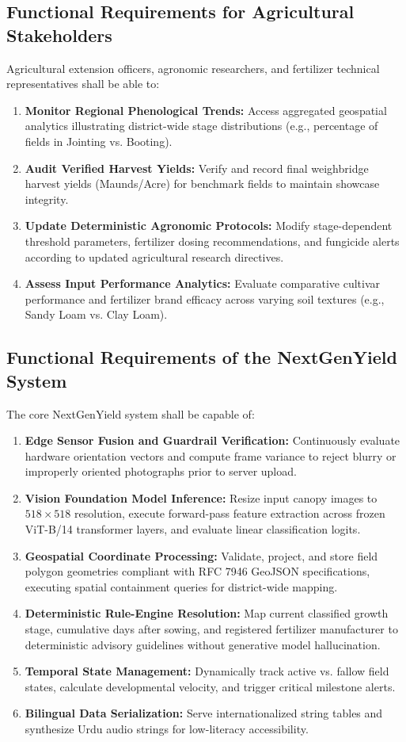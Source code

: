 \subsection{Functional Requirements for Agricultural Stakeholders}
Agricultural extension officers, agronomic researchers, and fertilizer technical representatives shall be able to:
\begin{enumerate}
    \item \textbf{Monitor Regional Phenological Trends:} Access aggregated geospatial analytics illustrating district-wide stage distributions (e.g., percentage of fields in Jointing vs. Booting).
    \item \textbf{Audit Verified Harvest Yields:} Verify and record final weighbridge harvest yields (Maunds/Acre) for benchmark fields to maintain showcase integrity.
    \item \textbf{Update Deterministic Agronomic Protocols:} Modify stage-dependent threshold parameters, fertilizer dosing recommendations, and fungicide alerts according to updated agricultural research directives.
    \item \textbf{Assess Input Performance Analytics:} Evaluate comparative cultivar performance and fertilizer brand efficacy across varying soil textures (e.g., Sandy Loam vs. Clay Loam).
\end{enumerate}

\subsection{Functional Requirements of the NextGenYield System}
The core NextGenYield system shall be capable of:
\begin{enumerate}
    \item \textbf{Edge Sensor Fusion and Guardrail Verification:} Continuously evaluate hardware orientation vectors and compute frame variance to reject blurry or improperly oriented photographs prior to server upload.
    \item \textbf{Vision Foundation Model Inference:} Resize input canopy images to $518 \times 518$ resolution, execute forward-pass feature extraction across frozen ViT-B/14 transformer layers, and evaluate linear classification logits.
    \item \textbf{Geospatial Coordinate Processing:} Validate, project, and store field polygon geometries compliant with RFC 7946 GeoJSON specifications, executing spatial containment queries for district-wide mapping.
    \item \textbf{Deterministic Rule-Engine Resolution:} Map current classified growth stage, cumulative days after sowing, and registered fertilizer manufacturer to deterministic advisory guidelines without generative model hallucination.
    \item \textbf{Temporal State Management:} Dynamically track active vs. fallow field states, calculate developmental velocity, and trigger critical milestone alerts.
    \item \textbf{Bilingual Data Serialization:} Serve internationalized string tables and synthesize Urdu audio strings for low-literacy accessibility.
\end{enumerate}

